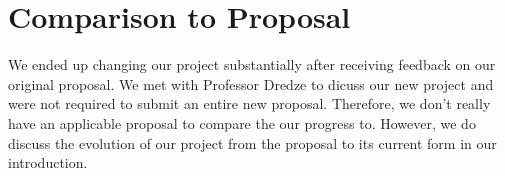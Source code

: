 \documentclass[11pt,a4paper,twocolumn]{article}
\begin{document}
\section{Comparison to Proposal}
We ended up changing our project substantially after receiving feedback on our original proposal. We
met with Professor Dredze to dicuss our new project and were not required to submit an entire new
proposal. Therefore, we don't really have an applicable proposal to compare the our progress to.
However, we do discuss the evolution of our project from the proposal to its current form
in our introduction.
\end{document}
